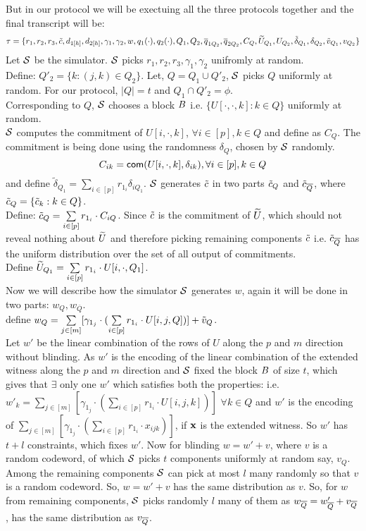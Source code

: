 But in our protocol we will be exectuing all the three protocols together and the final transcript will be:
$$\tau = \{r_1, r_2, r_3, \tilde{c}, d_{1[h]}, d_{2[h]}, \gamma_1, \gamma_2, w, q_1(\cdot), q_2(\cdot), Q_1, Q_2, \overline{q}_{1Q_2}, \overline{q}_{2Q_2}, C_Q, \widetilde{U}_{Q_1}, U_{Q_2}, \tilde{\delta}_{Q_1}, \delta_{Q_2}, \tilde{v}_{Q_1}, v_{Q_2} \}$$
Let ${\cal S}$ be the simulator. ${\cal S}$ picks $r_1, r_2, r_3, \gamma_1, \gamma_2$ unifromly at random. \\
Define: $Q'_2=\{k: (j,k)\in Q_2\}$.
Let, $Q = Q_1\cup Q'_2$, ${\cal S}$ picks $Q$ uniformly at random.
For our protocol, $|Q|=t$ and $Q_1\cap Q'_2=\phi$.\\
Corresponding to $Q$, ${\cal S}$ chooses a block $B$ i.e. $\{U[\cdot,\cdot,k]: k\in Q\}$ uniformly at random. \\
${\cal S}$ computes the commitment of $U[i,\cdot,k]$, $\forall i\in [p], k\in Q$ and define as $C_Q$. The commitment is being done using the randomness $\delta_Q$, chosen by ${\cal S}$ randomly.
$$C_{ik}= \mathsf{com}(U[i,\cdot,k],\delta_{ik}), \forall i\in [p], k \in Q$$
and define $\tilde{\delta}_{Q_1}= \sum\limits_{i\in[p]} r_{1_i}\delta_{iQ_1}$.
${\cal S}$ generates $\tilde{c}$ in two parts $\tilde{c}_Q$ and $\tilde{c}_{\overline{Q}}$, where $\tilde{c}_Q=\{\tilde{c}_k:k\in Q\}$.\\
Define: $\tilde{c}_Q=\sum\limits_{i \in [p]} r_{1_i}\cdot C_{iQ}$. Since $\tilde{c}$ is the commitment of $\widetilde{U}$, which should not reveal nothing about $\widetilde{U}$ and therefore picking remaining components $\tilde{c}$ i.e. $\tilde{c}_{\overline{Q}}$ has the uniform distribution over the set of all output of commitments.\\
Define $\widetilde{U}_{Q_1}= \sum\limits_{i\in [p]} r_{1_i}\cdot U[i,\cdot,Q_1]$.\\
Now we will describe how the simulator ${\cal S}$ generates $w$, again it will be done in two parts: $w_Q, w_{\overline{Q}}$. \\
define $w_Q=\sum\limits_{j\in [m]} [\gamma_{1_j}\cdot (\sum\limits_{i\in[p]} r_{1_i}\cdot U[i,j,Q])]+ \tilde{v}_Q$.\\
Let $w'$ be the linear combination of the rows of $U$ along the $p$ and $m$ direction without blinding. As $w'$ is the encoding of the linear combination of the extended witness along the $p$ and $m$ direction and ${\cal S}$ fixed the block $B$ of size $t$, which gives that $\exists$ only one $w'$ which satisfies both the properties: 
i.e. $w'_k=\sum\limits_{j\in [m]} [\gamma_{1_j}\cdot (\sum\limits_{i\in[p]} r_{1_i}\cdot U[i,j,k])]$ $\forall k\in Q$ and $w'$ is the encoding of $\sum\limits_{j\in[m]}[\gamma_{1_j}\cdot(\sum\limits_{i\in[p]} r_{1_i}\cdot x_{ijk})]$, if $\textbf{x}$ is the extended witness. So $w'$ has $t+l$ constraints, which fixes $w'$. Now for blinding $w=w'+v$, where $v$ is a random codeword, of which ${\cal S}$ picks $t$ components uniformly at random say, $v_Q$. Among the remaining components ${\cal S}$ can pick at most $l$ many randomly so that $v$ is a random codeword. So, $w=w'+v$ has the same distribution as $v$. So, for $w$ from remaining components, ${\cal S}$ picks randomly $l$ many of them as $w_{\overline{Q}}=w'_{\overline{Q}}+v_{\overline{Q}}$, has the same distribution as $v_{\overline{Q}}$.\\

